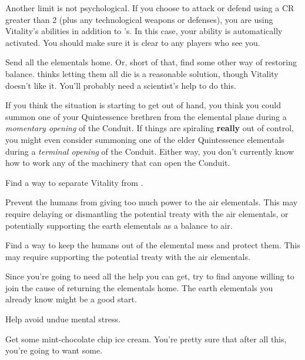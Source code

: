 \documentclass[char]{elementals}
\begin{document}
Another limit is not psychological.  If you choose to attack or defend using a CR greater than 2 (plus any technological weapons or defenses), you are using Vitality's abilities in addition to \cAvatar{}'s.  In this case, your \aGlowInDark{} ability is automatically activated.  You should make sure it is clear to any players who see you.

\begin{itemz}[Goals]
	\item  Send all the elementals home.  Or, short of that, find some other way of restoring balance.  \cAvatar{} thinks letting them all die is a reasonable solution, though Vitality doesn't like it.  You'll probably need a scientist's help to do this.
	\item If you think the situation is starting to get out of hand, you think you could summon one of your Quintessence brethren from the elemental plane during a \emph{momentary opening} of the Conduit. If things are spiraling \textbf{really} out of control, you might even consider summoning one of the elder Quintessence elementals during a \emph{terminal opening} of the Conduit. Either way, you don't currently know how to work any of the machinery that can open the Conduit.
	\item  Find a way to separate Vitality from \cAvatar{}. %
	\item  Prevent the humans from giving too much power to the air elementals.  This may require delaying or dismantling the potential treaty with the air elementals, or potentially supporting the earth elementals as a balance to air.
	\item  Find a way to keep the humans out of the elemental mess and protect them.  This may require supporting the potential treaty with the air elementals.
	\item  Since you're going to need all the help you can get, try to find anyone willing to join the cause of returning the elementals home.  The earth elementals you already know might be a good start.
	\item  Help \cDiplomat{} avoid undue mental stress.
	\item  Get some mint-chocolate chip ice cream.  You're pretty sure that after all this, you're going to want some.
\end{itemz}
\end{document}
